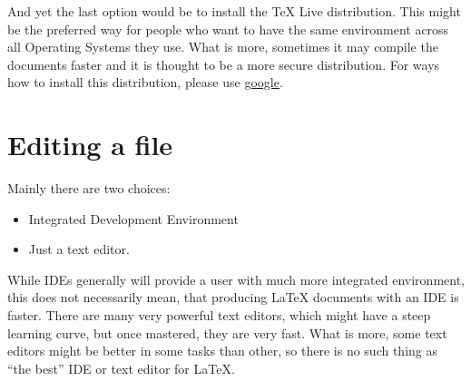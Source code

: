 \documentclass[
    draft
]{scrartcl}
\begin{document}
%
And yet the last option would be to install the \TeX{} Live distribution.
%
This might be the preferred way for people who want to have the same environment
    across all Operating Systems they use.
%
What is more, sometimes it may compile the documents faster and it is thought to
    be a more secure distribution.
%
For ways how to install this distribution, please use
    \href{http://www.google.co.uk}{google}.


\section{Editing a  file}

Mainly there are two choices:
\begin{itemize}
    \item Integrated Development Environment
    \item Just a text editor.
\end{itemize}

%
While IDEs generally will provide a user with much more integrated environment,
    this does not necessarily mean, that producing \LaTeX{} documents with an
    IDE is faster. 
%
There are many very powerful text editors, which might have a steep learning
    curve, but once mastered, they are very fast.
%
What is more, some text editors might be better in some tasks than other, so
    there is no such thing as ``the best'' IDE or text editor for \LaTeX{}.
\end{document}
